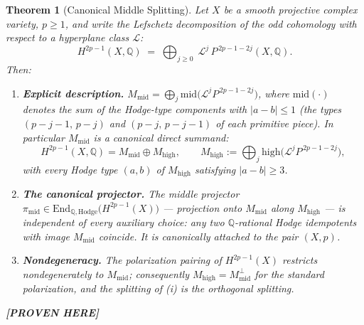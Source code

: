 \documentclass[11pt]{article}
\newtheorem{theorem}{Theorem}
\newcommand{\PROVEN}{\textbf{[PROVEN HERE]}}
\newcommand{\Q}{\mathbb{Q}}
\newcommand{\End}{\mathrm{End}}
\begin{document}
\begin{theorem}[Canonical Middle Splitting]\label{thm:s1}
Let $X$ be a smooth projective complex variety, $p\ge1$, and write the
Lefschetz decomposition of the odd cohomology with respect to a hyperplane
class $\mathcal L$:
\[
H^{2p-1}(X,\Q)\;=\;\bigoplus_{j\ge0}\;\mathcal L^{j}\,P^{\,2p-1-2j}(X,\Q).
\]
Then:
\begin{enumerate}[label=(\roman*)]
\item \textbf{Explicit description.}
$M_{\mathrm{mid}}=\bigoplus_j \mathrm{mid}\bigl(\mathcal L^{j}
P^{\,2p-1-2j}\bigr)$, where $\mathrm{mid}(\cdot)$ denotes the sum of the
Hodge-type components with $|a-b|\le1$ (the types
$(p-j-1,\,p-j)$ and $(p-j,\,p-j-1)$ of each primitive piece). In particular
$M_{\mathrm{mid}}$ is a \emph{canonical direct summand}:
\[
H^{2p-1}(X,\Q)=M_{\mathrm{mid}}\oplus M_{\mathrm{high}},\qquad
M_{\mathrm{high}}:=\bigoplus_j \mathrm{high}\bigl(\mathcal L^{j}
P^{\,2p-1-2j}\bigr),
\]
with every Hodge type $(a,b)$ of $M_{\mathrm{high}}$ satisfying
$|a-b|\ge3$.
\item \textbf{The canonical projector.} The \emph{middle projector}
$\pi_{\mathrm{mid}}\in\End_{\Q,\mathrm{Hodge}}\bigl(H^{2p-1}(X)\bigr)$ ---
projection onto $M_{\mathrm{mid}}$ along $M_{\mathrm{high}}$ --- is
\emph{independent of every auxiliary choice}: any two $\Q$-rational Hodge
idempotents with image $M_{\mathrm{mid}}$ coincide. It is canonically
attached to the pair $(X,p)$.
\item \textbf{Nondegeneracy.} The polarization pairing of $H^{2p-1}(X)$
restricts nondegenerately to $M_{\mathrm{mid}}$; consequently
$M_{\mathrm{high}}=M_{\mathrm{mid}}^{\perp}$ for the standard polarization,
and the splitting of (i) is the orthogonal splitting.
\end{enumerate}
\PROVEN{}
\end{theorem}
\end{document}

